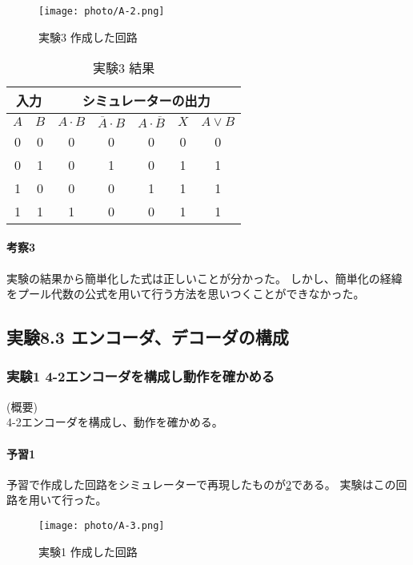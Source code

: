 \documentclass[dvipdfmx]{jsarticle}
\begin{document}
\begin{figure}
  \begin{center}
    \texttt{[image: photo/A-2.png]}
  \end{center}
  \caption{実験3 作成した回路}
  \label{fig:A-2}
\end{figure}

\begin{table}
  \centering
  \caption{実験3 結果}
  \begin{tabular}{|c|c||c|c|c|c|c|} \hline
    \multicolumn{2}{|c||}{入力} & \multicolumn{5}{c|}{シミュレーターの出力} \\ \hline
      $A$ & $B$ & $A \cdot B$ & $\overline{A} \cdot B$ & $A \cdot \overline{B}$ & $X$ & $A \vee B$ \\ \hline
      0 & 0 & 0 & 0 & 0 & 0 & 0\\ \hline
      0 & 1 & 0 & 1 & 0 & 1 & 1\\ \hline
      1 & 0 & 0 & 0 & 1 & 1 & 1\\ \hline
      1 & 1 & 1 & 0 & 0 & 1 & 1\\ \hline
  \end{tabular}
  \label{tb:A-5}
\end{table}

\paragraph{考察3}
実験の結果から簡単化した式は正しいことが分かった。
しかし、簡単化の経緯をプール代数の公式を用いて行う方法を思いつくことができなかった。

\subsection{実験8.3 エンコーダ、デコーダの構成}

\subsubsection{実験1 4-2エンコーダを構成し動作を確かめる}
(概要)\\
4-2エンコーダを構成し、動作を確かめる。

\paragraph*{予習1}
予習で作成した回路をシミュレーターで再現したものが\ref*{fig:A-3}である。
実験はこの回路を用いて行った。

\begin{figure}[h]
  \begin{center}
    \texttt{[image: photo/A-3.png]}
  \end{center}
  \caption{実験1 作成した回路}
  \label{fig:A-3}
\end{figure}
\end{document}
